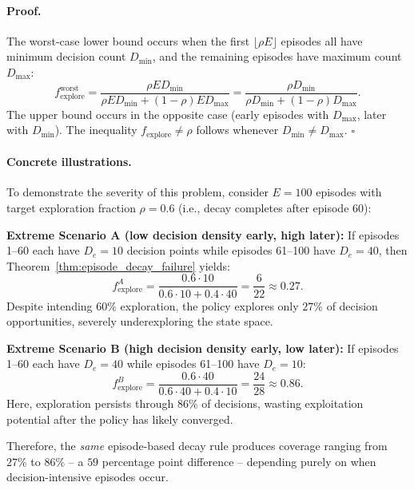 \paragraph{Proof.}
The worst-case lower bound occurs when the first $\lfloor \rho E \rfloor$ episodes
all have minimum decision count $D_{\min}$, and the remaining episodes have maximum
count $D_{\max}$:
\begin{equation}
f_{\text{explore}}^{\text{worst}}
=
\frac{\rho E D_{\min}}{\rho E D_{\min} + (1-\rho)E D_{\max}}
=
\frac{\rho D_{\min}}{\rho D_{\min} + (1-\rho) D_{\max}}.
\end{equation}
The upper bound occurs in the opposite case (early episodes with $D_{\max}$,
later with $D_{\min}$). The inequality $f_{\text{explore}} \neq \rho$ follows
whenever $D_{\min} \neq D_{\max}$. $\square$

\paragraph{Concrete illustrations.}
To demonstrate the severity of this problem, consider $E=100$ episodes with 
target exploration fraction $\rho=0.6$ (i.e., decay completes after episode 60):

\textbf{Extreme Scenario A (low decision density early, high later):}
If episodes 1--60 each have $D_e=10$ decision points while episodes 61--100 have
$D_e=40$, then Theorem~\ref{thm:episode_decay_failure} yields:
\begin{equation}
f_{\text{explore}}^{A}
=
\frac{0.6 \cdot 10}{0.6 \cdot 10 + 0.4 \cdot 40}
=
\frac{6}{22}
\approx 0.27.
\label{eq:scenario_A_fraction}
\end{equation}
Despite intending $60\%$ exploration, the policy explores only $27\%$ of decision
opportunities, severely underexploring the state space.

\textbf{Extreme Scenario B (high decision density early, low later):}
If episodes 1--60 each have $D_e=40$ while episodes 61--100 have $D_e=10$:
\begin{equation}
f_{\text{explore}}^{B}
=
\frac{0.6 \cdot 40}{0.6 \cdot 40 + 0.4 \cdot 10}
=
\frac{24}{28}
\approx 0.86.
\label{eq:scenario_B_fraction}
\end{equation}
Here, exploration persists through $86\%$ of decisions, wasting exploitation
potential after the policy has likely converged.

Therefore, the \emph{same} episode-based decay rule produces coverage ranging
from $27\%$ to $86\%$ -- a $59$ percentage point difference -- depending purely
on when decision-intensive episodes occur.

